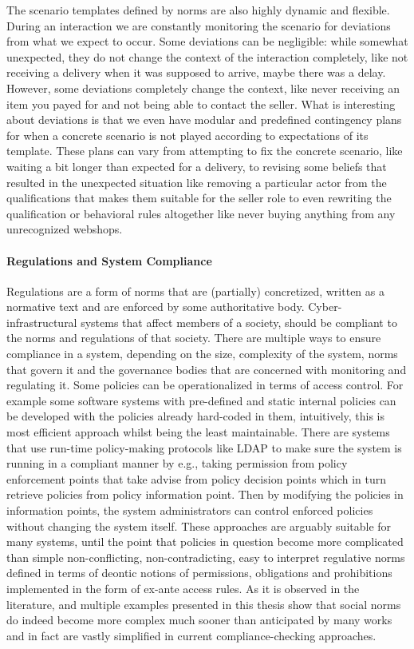 The scenario templates defined by norms are also highly dynamic and flexible. During an interaction we are constantly monitoring the scenario for deviations from what we expect to occur. Some deviations can be negligible: while somewhat unexpected, they do not change the context of the interaction completely, like not receiving a delivery when it was supposed to arrive, maybe there was a delay. However, some deviations completely change the context, like never receiving an item you payed for and not being able to contact the seller. What is interesting about deviations is that we even have modular and predefined contingency plans for when a concrete scenario is not played according to expectations of its template. These plans can vary from attempting to fix the concrete scenario, like waiting a bit longer than expected for a delivery, to revising some beliefs that resulted in the unexpected situation like removing a particular actor from the qualifications that makes them suitable for the seller role to even rewriting the qualification or behavioral rules altogether like never buying anything from any unrecognized webshops.

\paragraph{Regulations and System Compliance}
Regulations are a form of norms that are (partially) concretized, written as a normative text and are enforced by some authoritative body.  Cyber-infrastructural systems that affect members of a society, should be compliant to the norms and regulations of that society. There are multiple ways to ensure compliance in a system, depending on the size, complexity of the system, norms that govern it and the governance bodies that are concerned with monitoring and regulating it. Some policies can be operationalized in terms of access control. For example some software systems with pre-defined and static internal policies can be developed with the policies already hard-coded in them, intuitively, this is most efficient approach whilst being the least maintainable. There are systems that use run-time policy-making protocols like LDAP to make sure the system is running in a compliant manner by e.g., taking permission from policy enforcement points that take advise from policy decision points which in turn retrieve policies from policy information point. Then by modifying the policies in information points, the system administrators can control enforced policies without changing the system itself. These approaches are arguably suitable for many systems, until the point that policies in question become more complicated than simple non-conflicting, non-contradicting, easy to interpret regulative norms defined in terms of deontic notions of permissions, obligations and prohibitions implemented in the form of ex-ante access rules. As it is observed in the literature, and multiple examples presented in this thesis show that social norms do indeed become more complex much sooner than anticipated by many works and in fact are vastly simplified in current compliance-checking approaches. 


